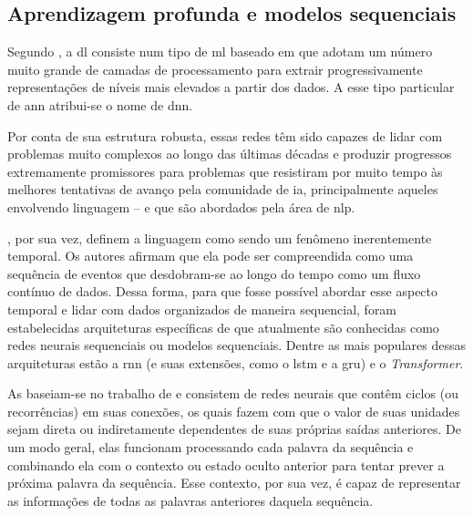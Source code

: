 
\subsection{Aprendizagem profunda e modelos sequenciais}
\label{sec:am-ap}

Segundo , a \acrfull{dl} consiste num tipo de \acrlong{ml} baseado em  que adotam um número muito grande de camadas de processamento para extrair progressivamente representações de níveis mais elevados a partir dos dados.
A esse tipo particular de \acrshort{ann} atribui-se o nome de \acrfull{dnn}.

Por conta de sua estrutura robusta, essas redes têm sido capazes de lidar com problemas muito complexos ao longo das últimas décadas e produzir progressos extremamente promissores para problemas que resistiram por muito tempo às melhores tentativas de avanço pela comunidade de \acrshort{ia}, principalmente aqueles envolvendo linguagem -- e que são abordados pela área de \acrfull{nlp}.



, por sua vez, definem a linguagem como sendo um fenômeno inerentemente temporal. Os autores afirmam que ela pode ser compreendida como uma sequência de eventos que desdobram-se ao longo do tempo como um fluxo contínuo de dados.
Dessa forma, para que fosse possível abordar esse aspecto temporal e lidar com dados organizados de maneira sequencial, foram estabelecidas arquiteturas específicas de  que atualmente são conhecidas como redes neurais sequenciais ou modelos sequenciais.
Dentre as mais populares dessas arquiteturas estão a \acrfull{rnn} (e suas extensões, como o \acrfull{lstm} e a \acrfull{gru}) e o \textit{Transformer}.

As  baseiam-se no trabalho de  e consistem de redes neurais que contêm ciclos (ou recorrências) em suas conexões, os quais fazem com que o valor de suas unidades sejam direta ou indiretamente dependentes de suas próprias saídas anteriores.
De um modo geral, elas funcionam processando cada palavra da sequência e combinando ela com o contexto ou estado oculto anterior para tentar prever a próxima palavra da sequência. Esse contexto, por sua vez, é capaz de representar as informações de todas as palavras anteriores daquela sequência.

